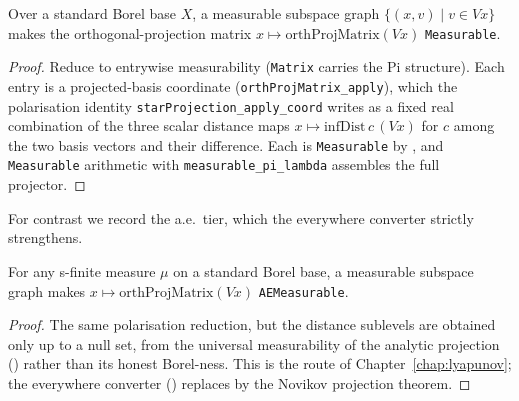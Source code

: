 \begin{theorem}\label{thm:dst-projmatrix-converter}
  \leanok
  Over a standard Borel base \(X\), a measurable subspace graph \(\{(x,v)\mid v\in V x\}\) makes the
  orthogonal-projection matrix \(x\mapsto\mathrm{orthProjMatrix}(V x)\) \texttt{Measurable}.
\end{theorem}
\begin{proof}\leanok
  Reduce to entrywise measurability (\texttt{Matrix} carries the Pi structure). Each entry is a
  projected-basis coordinate (\texttt{orthProjMatrix\_apply}), which the polarisation identity
  \texttt{starProjection\_apply\_coord} writes as a fixed real combination of the three scalar
  distance maps \(x\mapsto\mathrm{infDist}\,c\,(V x)\) for \(c\) among the two basis vectors and
  their difference. Each is \texttt{Measurable} by , and \texttt{Measurable}
  arithmetic with \texttt{measurable\_pi\_lambda} assembles the full projector.
\end{proof}

For contrast we record the a.e.\ tier, which the everywhere converter strictly strengthens.

\begin{theorem}\label{thm:dst-aeconverter}
  \leanok
  For any s-finite measure \(\mu\) on a standard Borel base, a measurable subspace graph makes
  \(x\mapsto\mathrm{orthProjMatrix}(V x)\) \texttt{AEMeasurable}.
\end{theorem}
\begin{proof}\leanok
  The same polarisation reduction, but the distance sublevels are obtained only up to a null set,
  from the universal measurability of the analytic projection () rather than
  its honest Borel-ness. This is the route of Chapter~\ref{chap:lyapunov}; the everywhere converter
  () replaces  by the Novikov projection
  theorem.
\end{proof}


